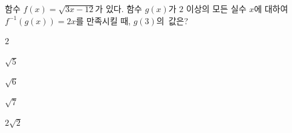 함수 $f(x)=\sqrt{3x-12}$가 있다. 함수 $g(x)$가 $2$ 이상의 모든 실수 $x$에 대하여 $f^{-1}(g(x))=2x$를 만족시킬 때, \mbox{$g(3)$의 값은?}
\begin{choices32}{\rule[-3ex]{0pt}{8ex}$2$}{\rule[-3ex]{0pt}{8ex}$\sqrt{5}$}{\rule[-3ex]{0pt}{8ex}$\sqrt{6}$}{\rule[-3ex]{0pt}{8ex}$\sqrt{7}$}{\rule[-3ex]{0pt}{8ex}$2\sqrt{2}$}\end{choices32}
